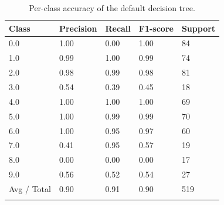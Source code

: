 \begin{table}
\centering
\small{
  \centering
  \begin{tabular}{l|llll} 
	\toprule
   		Class &  Precision  &  Recall &  F1-score  &  Support  \\    
    \midrule
		0.0   &    1.00   &   0.00   &   1.00   &     84   \\
        1.0   &    0.99   &   1.00   &   0.99   &     74   \\
        2.0   &    0.98   &   0.99   &   0.98   &     81   \\
        3.0   &    0.54   &   0.39   &   0.45   &     18   \\
        4.0   &    1.00   &   1.00   &   1.00   &     69   \\
        5.0   &    1.00   &   0.99   &   0.99   &     70   \\
        6.0   &    1.00   &   0.95   &   0.97   &     60   \\
        7.0   &    0.41   &   0.95   &   0.57   &     19   \\
        8.0   &    0.00   &   0.00   &   0.00   &     17   \\
        9.0   &    0.56   &   0.52   &   0.54   &     27   \\
    \midrule
Avg / Total   &    0.90   &   0.91   &   0.90   &    519   \\
   \bottomrule&
   \end{tabular}
 }
\caption{Per-class accuracy of the default decision tree.}
\label{tab:dt_stats}
\end{table}


% 
% 
% 
